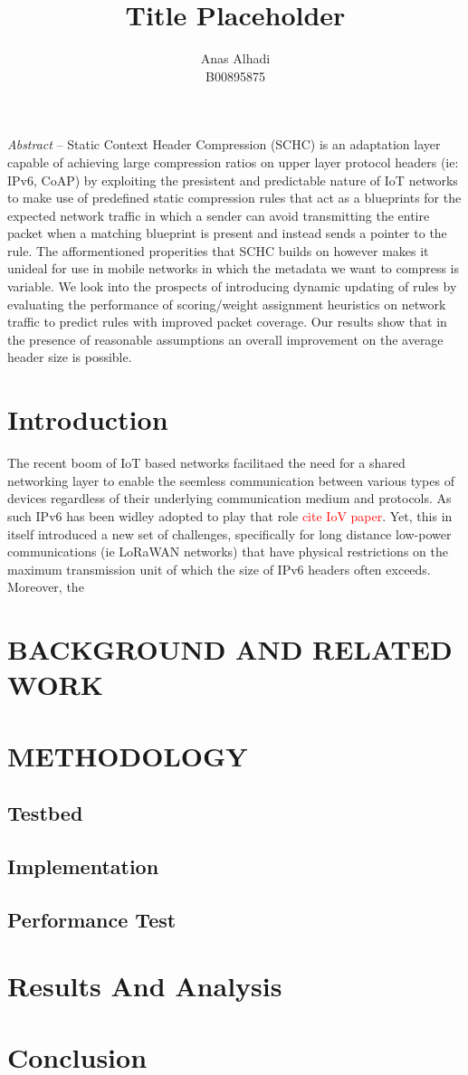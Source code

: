 \documentclass[cspaper]{IEEEtran}
\title{Title Placeholder}
\author{Anas Alhadi\\B00895875}
\numberwithin{equation}{subsection}
\begin{document}
	\maketitle
	
	\newpage
	\thispagestyle{fancy}


	\par{
		\emph{Abstract} -- Static Context Header Compression (SCHC) is an adaptation layer
		capable of achieving large compression ratios on upper layer protocol headers (ie: IPv6, CoAP) by exploiting the presistent and predictable nature of 
		IoT networks to make use of predefined static compression rules that act as a blueprints for the 
		expected network traffic in which a sender can avoid transmitting the entire packet when a matching blueprint is present and instead sends a pointer to the rule. The 
		afformentioned properities that SCHC builds on however makes it unideal for use in mobile networks in which the metadata we want to compress is variable.
		We look into the prospects of introducing dynamic updating of rules by evaluating the performance of scoring/weight assignment heuristics on
		network traffic to predict rules with improved packet coverage. Our results show that in the presence of reasonable assumptions an overall 
		improvement on the average header size is possible. 
	}

	\section{Introduction}
	\par{
			The recent boom of IoT based networks facilitaed the need for a shared networking layer to enable the seemless 
			communication between various types of devices regardless of their underlying communication medium and protocols. As such IPv6 
			has been widley adopted to play that role \textcolor{red}{cite IoV paper}. Yet, this in itself introduced a new set of challenges, specifically for long distance low-power
			communications (ie LoRaWAN networks) that have physical restrictions on the maximum transmission unit of which the size of IPv6 headers often exceeds. Moreover, the 
	}	
	\section{BACKGROUND AND RELATED WORK}
	\section{METHODOLOGY}
	\subsection{Testbed}
	\subsection{Implementation}
	\subsection{Performance Test}

	\section{Results And Analysis}

	\section{Conclusion}
\end{document}
